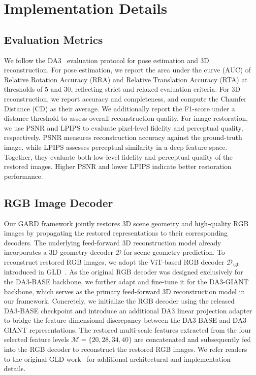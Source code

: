 \section{Implementation Details}

\subsection{Evaluation Metrics}
We follow the DA3~\cite{depthanything3} evaluation protocol for pose estimation and 3D reconstruction. For pose estimation, we report the area under the curve (AUC) of Relative Rotation Accuracy (RRA) and Relative Translation Accuracy (RTA) at thresholds of 5 and 30, reflecting strict and relaxed evaluation criteria. For 3D reconstruction, we report accuracy and completeness, and compute the Chamfer Distance (CD) as their average. We additionally report the F1-score under a distance threshold to assess overall reconstruction quality. For image restoration, we use PSNR and LPIPS to evaluate pixel-level fidelity and perceptual quality, respectively. PSNR measures reconstruction accuracy against the ground-truth image, while LPIPS assesses perceptual similarity in a deep feature space. Together, they evaluate both low-level fidelity and perceptual quality of the restored images. Higher PSNR and lower LPIPS indicate better restoration performance.



\subsection{RGB Image Decoder}
Our GARD framework jointly restores 3D scene geometry and high-quality RGB images by propagating the restored representations to their corresponding decoders. The underlying feed-forward 3D reconstruction model already incorporates a 3D geometry decoder $\mathcal{D}$ for scene geometry prediction. To reconstruct restored RGB images, we adopt the ViT-based RGB decoder $\mathcal{D}_{\text{rgb}}$ introduced in GLD~\cite{jang2026gld}. As the original RGB decoder was designed exclusively for the DA3-BASE backbone, we further adapt and fine-tune it for the DA3-GIANT backbone, which serves as the primary feed-forward 3D reconstruction model in our framework. Concretely, we initialize the RGB decoder using the released DA3-BASE checkpoint and introduce an additional DA3 linear projection adapter to bridge the feature dimensional discrepancy between the DA3-BASE and DA3-GIANT representations. The restored multi-scale features extracted from the four selected feature levels $\mathcal{M}=\{20, 28, 34, 40\}$ are concatenated and subsequently fed into the RGB decoder to reconstruct the restored RGB images. We refer readers to the original GLD work~\cite{jang2026gld} for additional architectural and implementation details.



